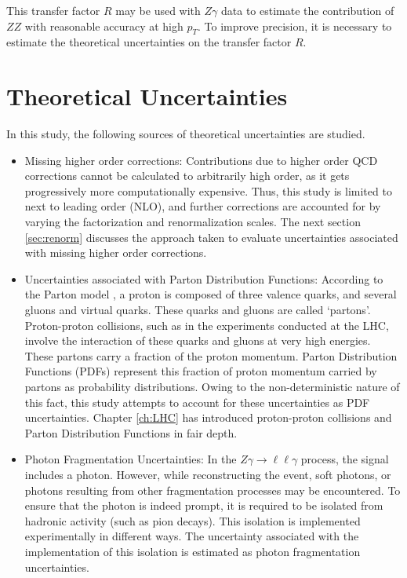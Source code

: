 \documentclass[12pt,a4paper,openright,twoside]{report}
\newcommand{\Zg}{$Z\gamma\to \ell\ell\gamma$ }
\begin{document}
This transfer factor $R$ may be used with $Z\gamma$ data to estimate the contribution of $ZZ$ with reasonable accuracy at high $p_T$. To improve precision, it is necessary to estimate the theoretical uncertainties on the transfer factor $R$.

\section{Theoretical Uncertainties}
In this study, the following sources of theoretical uncertainties are studied.
\begin{itemize}
\item Missing higher order corrections: Contributions due to higher order QCD corrections cannot be calculated to arbitrarily high order, as it gets progressively more computationally expensive. Thus, this study is limited to next to leading order (NLO), and further corrections are accounted for by varying the factorization and renormalization scales. The next section \ref{sec:renorm} discusses the approach taken to evaluate uncertainties associated with missing higher order corrections.

\item Uncertainties associated with Parton Distribution Functions: According to the Parton model \cite{parton_model}, a proton is composed of three valence quarks, and several gluons and virtual quarks. These quarks and gluons are called `partons'. Proton-proton collisions, such as in the experiments conducted at the LHC, involve the interaction of these quarks and gluons at very high energies. These partons carry a fraction of the proton momentum. Parton Distribution Functions (PDFs) represent this fraction of proton momentum carried by partons as probability distributions. Owing to the non-deterministic nature of this fact, this study attempts to account for these uncertainties as PDF uncertainties. Chapter \ref{ch:LHC} has introduced proton-proton collisions and Parton Distribution Functions in fair depth.

\item Photon Fragmentation Uncertainties: In the \Zg process, the signal includes a photon. However, while reconstructing the event, soft photons, or photons resulting from other fragmentation processes may be encountered. To ensure that the photon is indeed prompt, it is required to be isolated from hadronic activity (such as pion decays). This isolation is implemented experimentally in different ways. The uncertainty associated with the implementation of this isolation is estimated as photon fragmentation uncertainties.
\end{itemize}
\end{document}
